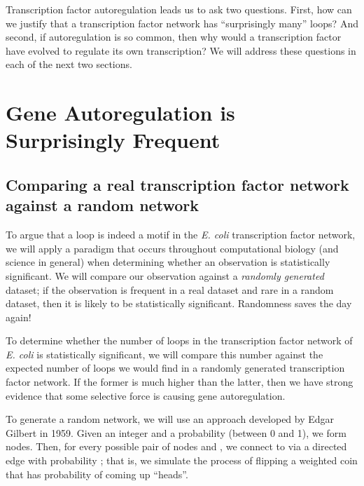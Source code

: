 Transcription factor autoregulation leads us to ask two questions. First, how can we justify that a transcription factor network has ``surprisingly many'' loops? And second, if autoregulation is so common, then why would a transcription factor have evolved to regulate its own transcription? We will address these questions in each of the next two sections.\\

\FloatBarrier
{}

\section{Gene Autoregulation is Surprisingly Frequent}
\label{sec:gene_autoregulation_is_surprisingly_frequent}

\subsection{Comparing a real transcription factor network against a random network}

To argue that a loop is indeed a motif in the \textit{E. coli} transcription factor network, we will apply a paradigm that occurs throughout computational biology (and science in general) when determining whether an observation is statistically significant. We will compare our observation against a  \textit{randomly generated} dataset; if the observation is frequent in a real dataset and rare in a random dataset, then it is likely to be statistically significant. Randomness saves the day again!\\

 \begin{qbox}\end{qbox}

To determine whether the number of loops in the transcription factor network of \textit{E. coli} is statistically significant, we will compare this number against the expected number of loops we would find in a randomly generated transcription factor network. If the former is much higher than the latter, then we have strong evidence that some selective force is causing gene autoregulation.

To generate a random network, we will use an approach developed by Edgar Gilbert in 1959. Given an integer  and a probability  (between 0 and 1), we form  nodes. Then, for every possible pair of nodes  and , we connect  to  via a directed edge with probability ; that is, we simulate the process of flipping a weighted coin that has probability  of coming up ``heads''.\\

